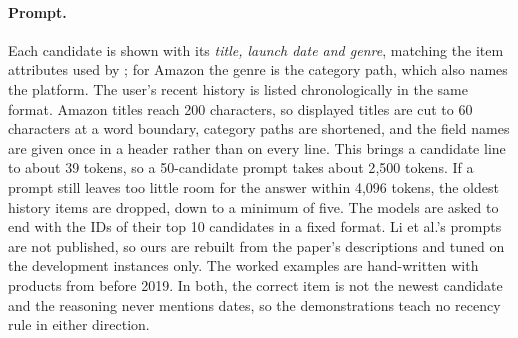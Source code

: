 \documentclass[11pt]{article}
\begin{document}
\paragraph{Prompt.} Each candidate is shown with its \emph{title, launch date and genre}, matching the item attributes used by \citet{li2026llmreasoning}; for Amazon the genre is the category path, which also names the platform. The user's recent history is listed chronologically in the same format. Amazon titles reach 200 characters, so displayed titles are cut to 60 characters at a word boundary, category paths are shortened, and the field names are given once in a header rather than on every line. This brings a candidate line to about 39 tokens, so a 50-candidate prompt takes about 2{,}500 tokens. If a prompt still leaves too little room for the answer within 4{,}096 tokens, the oldest history items are dropped, down to a minimum of five. The models are asked to end with the IDs of their top 10 candidates in a fixed format. Li et al.'s prompts are not published, so ours are rebuilt from the paper's descriptions and tuned on the development instances only. The worked examples are hand-written with products from before 2019. In both, the correct item is not the newest candidate and the reasoning never mentions dates, so the demonstrations teach no recency rule in either direction.
\end{document}

